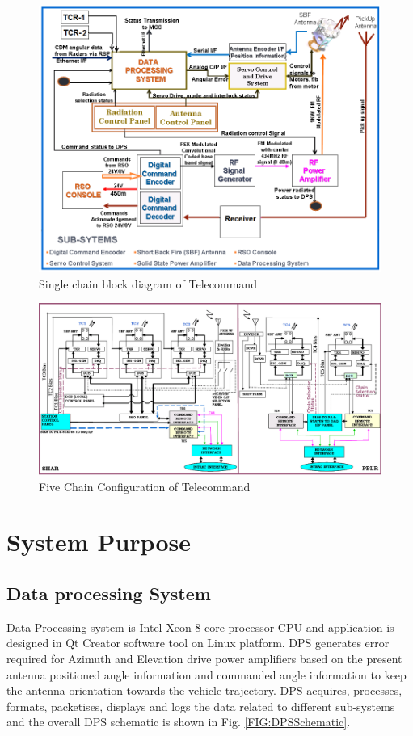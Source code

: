\begin{figure}[H]
	\centering
	\includegraphics[width=\linewidth]{./Diagrams/TCSingleChainDiag.png}
	\caption{Single chain block diagram of Telecommand}
	\label{FIG:TcSingleChain}
\end{figure}

\begin{figure}[H]
	\centering
	\includegraphics[width=\linewidth]{./Diagrams/TC5ChainConfg1.png}
	\caption{Five Chain Configuration of Telecommand}
	\label{FIG:FiveChConfig}
\end{figure}

\section{System Purpose}

\subsection{Data processing System}
Data Processing system is Intel Xeon 8 core processor CPU and application is designed in Qt Creator software tool on Linux platform. DPS generates error required for Azimuth and Elevation drive power amplifiers based on the present antenna positioned angle information and commanded angle information to keep the antenna orientation towards the vehicle trajectory. DPS acquires, processes, formats, packetises, displays and logs the data related to different sub-systems and the overall DPS schematic is shown in Fig. \ref{FIG:DPSSchematic}.

